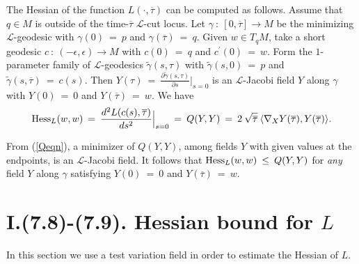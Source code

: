 The Hessian of the function
$L(\cdot, \overline{\tau})$ can be computed as follows.
Assume that $q \in M$ is outside of the time-$\overline{\tau}$
${\mathcal L}$-cut locus. Let $\gamma \: : \: [0, \overline{\tau}]
\rightarrow M$ be the minimizing ${\mathcal L}$-geodesic with
$\gamma(0) \: = \: p$ and $\gamma(\overline{\tau}) \: = \: q$.
Given $w \in T_qM$, take a short geodesic $c \: : \: (-\epsilon,
\epsilon) \rightarrow M$ with $c(0) \: = \: q$ and $c^\prime(0) \: = \: w$.
Form the $1$-parameter
family of ${\mathcal L}$-geodesics $\tilde\gamma(s, \tau)$ with
$\tilde\gamma(s, 0) \: = \: p$ and
$\tilde\gamma(s, \overline{\tau}) \: = \: c(s)$.
Then $Y(\tau) \: = \: \frac{\partial \tilde\gamma(s, \tau)}{\partial s}
\Big|_{s=0}$ is an ${\mathcal L}$-Jacobi field $Y$ along $\gamma$ with
$Y(0) \: = \: 0$ and $Y(\overline{\tau}) \: = \: w$.
We have
\begin{equation} \label{hesseq}
\operatorname{Hess}_L(w, w) \: = \: \frac{d^2 L(c(s),
\overline{\tau})}{ds^2} \Big|_{s=0} \: = \:
Q(Y, Y) \: = \:
2 \: \sqrt{\overline{\tau}} \: \langle \nabla_X Y(\overline{\tau}),
Y(\overline{\tau}) \rangle.
\end{equation}


From (\ref{Qeqn}),
a minimizer of
$Q(Y, Y)$, among fields $Y$ with given values at the endpoints,
is an ${\mathcal L}$-Jacobi field.
It follows that
$\operatorname{Hess}_L(w, w) \: \le \: Q(Y, Y)$ for {\em any} field $Y$ along $\gamma$
satisfying
$Y(0) \: = \: 0$ and $Y(\overline{\tau}) \: = \: w$.


\section{I.(7.8)-(7.9). Hessian bound for $L$} \label{7.9}

In this section we use a test variation field in order to estimate
the Hessian of $L$.

